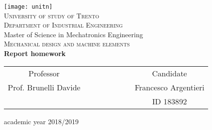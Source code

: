 \begin{titlepage}
 \begin{center}
 \texttt{[image: unitn]}\\
 \vspace{1.5em}
 {\Large \textsc{University of study of Trento}}\\
 \vspace{1.5em}
 {\Large \textsc{Department of Industrial Engineering}}\\
 \vspace{4em}
 {\normalsize Master of Science in Mechatronics Engineering}\\
 \vspace{1.5em}
 {\Large \textsc{Mechanical design and machine elements}}\\
 \vspace{4em}
 {\LARGE\textbf{
 	Report homework
 }}\\
 \end{center}

\vskip 2.0cm
\vskip 2.0cm
 \begin{center}
 \begin{tabular}{c c c c c c c c}
 Professor & & & & & & & Candidate \\[0.2cm]
 \large{Prof. Brunelli Davide} & & & & & & & \large{Francesco Argentieri}\\[0.4cm]
  & & & & & & & ID 183892\\[0.2cm]
 \end{tabular}
 \end{center}

\vskip 1.5cm
\begin{center}
{\normalsize academic year 2018/2019}
\end{center}
\end{titlepage}

\clearpage{\pagestyle{empty}\cleardoublepage}
